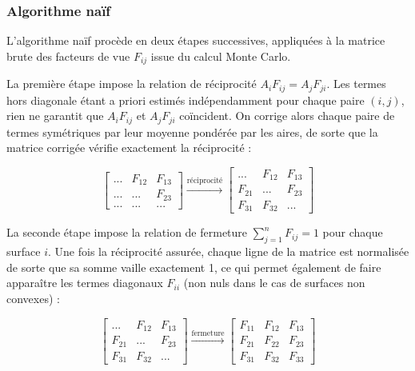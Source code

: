 \subsubsection{Algorithme naïf}

L'algorithme naïf procède en deux étapes successives, appliquées à la matrice brute des facteurs de vue $F_{ij}$ issue du calcul Monte Carlo.

La première étape impose la relation de réciprocité $A_i F_{ij} = A_j F_{ji}$. Les termes hors diagonale étant a priori estimés indépendamment pour chaque paire $(i,j)$, rien ne garantit que $A_i F_{ij}$ et $A_j F_{ji}$ coïncident. On corrige alors chaque paire de termes symétriques par leur moyenne pondérée par les aires, de sorte que la matrice corrigée vérifie exactement la réciprocité :

$$\begin{bmatrix}
                ... & F_{12} & F_{13}\\
                ... & ... & F_{23} \\
                ... & ... & ... 
        \end{bmatrix}
        \xrightarrow{\text{réciprocité}}
        \begin{bmatrix}
                ... & F_{12} & F_{13}\\
                F_{21} & ... & F_{23} \\
                F_{31} & F_{32} & ... 
        \end{bmatrix}$$

La seconde étape impose la relation de fermeture $\sum_{j=1}^n F_{ij} = 1$ pour chaque surface $i$. Une fois la réciprocité assurée, chaque ligne de la matrice est normalisée de sorte que sa somme vaille exactement 1, ce qui permet également de faire apparaître les termes diagonaux $F_{ii}$ (non nuls dans le cas de surfaces non convexes) :

$$\begin{bmatrix}
                ... & F_{12} & F_{13}\\
                F_{21} & ... & F_{23} \\
                F_{31} & F_{32} & ... 
        \end{bmatrix}
        \xrightarrow{\text{fermeture}}
        \begin{bmatrix}
                F_{11} & F_{12} & F_{13}\\
                F_{21} & F_{22} & F_{23} \\
                F_{31} & F_{32} & F_{33} 
        \end{bmatrix}$$

